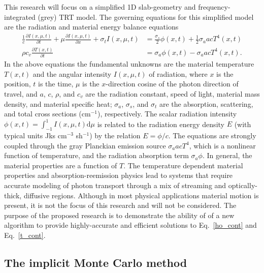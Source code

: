 \documentclass[11pt]{article}
\newcommand{\pderiv}[2]{\frac{\partial #1}{\partial #2}}
\renewcommand{\d}{\mathrm{d}}
\begin{document}
 This research will focus on a simplified 1D slab-geometry and
 frequency-integrated (grey) TRT model.  The governing equations for this simplified model are the radiation and material
 energy balance equations
\begin{align}\label{ho_cont}
    \frac{1}{c}\pderiv{I(x,\mu,t)}{t} + \mu \pderiv{I(x,\mu,t)}{x} + \sigma_t
    I(x,\mu,t)
&= \frac{\sigma_s}{2} \phi(x,t) +\frac{1}{2} \sigma_a a c T^4(x,t)
    \\ \label{t_cont}
  \rho c_v \pderiv{T(x,t)}{t} &=  \sigma_a \phi(x,t) - \sigma_a a c T^4(x,t).
\end{align}
In the above equations the fundamental unknowns are the material temperature $T(x,t)$ and
the angular intensity $I(x,\mu,t)$ of radiation, where $x$ is the position, $t$ is the time, $\mu$ is
the $x$-direction cosine of the photon direction of travel, and $a$, $c$, $\rho$,
and
$c_v$ are the radiation constant, speed of light, material mass density, and material specific heat; $\sigma_a$, $\sigma_s$, and
$\sigma_t$ are the absorption, scattering, and total
cross sections (cm$^{-1}$), respectively.  The scalar radiation intensity $\phi(x,t)=\int_{-1}^1
I(x,\mu,t) \d \mu$ is related to the radiation energy density
$E$ (with typical units Jks cm$^{-3}$ sh$^{-1}$) by the relation $E = \phi/c$.   The equations are
strongly coupled through the gray Planckian emission source $\sigma_a a c T^4$, which
is a nonlinear function of temperature, and the radiation absorption
term $\sigma_a \phi$.  In general, the material properties are a function of $T$.  The temperature dependent material properties and
absorption-reemission physics lead to systems that require accurate modeling of
photon transport through a  mix of
streaming and optically-thick, diffusive regions.  Although in most physical
applications material motion is present, it is not the focus of this research and will not
be considered.  The purpose of the proposed research is to demonstrate the ability of 
of a new algorithm to provide highly-accurate and efficient solutions to
Eq.~\eqref{ho_cont} and Eq.~\eqref{t_cont}.

\subsection{The implicit Monte Carlo method}
\end{document}
